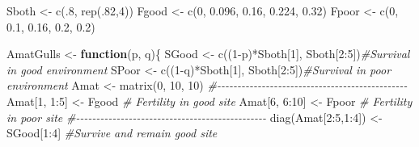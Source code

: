 \documentclass[
]{book}
\newenvironment{Shaded}{\begin{snugshade}}{\end{snugshade}}
\newcommand{\CommentTok}[1]{\textcolor[rgb]{0.56,0.35,0.01}{\textit{#1}}}
\newcommand{\ControlFlowTok}[1]{\textcolor[rgb]{0.13,0.29,0.53}{\textbf{#1}}}
\newcommand{\DecValTok}[1]{\textcolor[rgb]{0.00,0.00,0.81}{#1}}
\newcommand{\FloatTok}[1]{\textcolor[rgb]{0.00,0.00,0.81}{#1}}
\newcommand{\FunctionTok}[1]{\textcolor[rgb]{0.00,0.00,0.00}{#1}}
\newcommand{\NormalTok}[1]{#1}
\newcommand{\OtherTok}[1]{\textcolor[rgb]{0.56,0.35,0.01}{#1}}
\newcommand{\SpecialCharTok}[1]{\textcolor[rgb]{0.00,0.00,0.00}{#1}}
\begin{document}
\begin{Shaded}
\begin{Highlighting}[]
\NormalTok{Sboth }\OtherTok{\textless{}{-}} \FunctionTok{c}\NormalTok{(.}\DecValTok{8}\NormalTok{, }\FunctionTok{rep}\NormalTok{(.}\DecValTok{82}\NormalTok{,}\DecValTok{4}\NormalTok{))}
\NormalTok{Fgood }\OtherTok{\textless{}{-}} \FunctionTok{c}\NormalTok{(}\DecValTok{0}\NormalTok{, }\FloatTok{0.096}\NormalTok{, }\FloatTok{0.16}\NormalTok{, }\FloatTok{0.224}\NormalTok{, }\FloatTok{0.32}\NormalTok{) }
\NormalTok{Fpoor }\OtherTok{\textless{}{-}} \FunctionTok{c}\NormalTok{(}\DecValTok{0}\NormalTok{, }\FloatTok{0.1}\NormalTok{, }\FloatTok{0.16}\NormalTok{, }\FloatTok{0.2}\NormalTok{, }\FloatTok{0.2}\NormalTok{) }

\NormalTok{AmatGulls }\OtherTok{\textless{}{-}} \ControlFlowTok{function}\NormalTok{(p, q)\{}
\NormalTok{  SGood }\OtherTok{\textless{}{-}} \FunctionTok{c}\NormalTok{((}\DecValTok{1}\SpecialCharTok{{-}}\NormalTok{p)}\SpecialCharTok{*}\NormalTok{Sboth[}\DecValTok{1}\NormalTok{], Sboth[}\DecValTok{2}\SpecialCharTok{:}\DecValTok{5}\NormalTok{])}\CommentTok{\#Survival in good environment}
\NormalTok{  SPoor }\OtherTok{\textless{}{-}} \FunctionTok{c}\NormalTok{((}\DecValTok{1}\SpecialCharTok{{-}}\NormalTok{q)}\SpecialCharTok{*}\NormalTok{Sboth[}\DecValTok{1}\NormalTok{], Sboth[}\DecValTok{2}\SpecialCharTok{:}\DecValTok{5}\NormalTok{])}\CommentTok{\#Survival in poor environment}
\NormalTok{  Amat }\OtherTok{\textless{}{-}} \FunctionTok{matrix}\NormalTok{(}\DecValTok{0}\NormalTok{, }\DecValTok{10}\NormalTok{, }\DecValTok{10}\NormalTok{) }
  \CommentTok{\#{-}{-}{-}{-}{-}{-}{-}{-}{-}{-}{-}{-}{-}{-}{-}{-}{-}{-}{-}{-}{-}{-}{-}{-}{-}{-}{-}{-}{-}{-}{-}{-}{-}{-}{-}{-}{-}{-}{-}{-}{-}{-}{-}{-}{-}{-}{-}}
\NormalTok{  Amat[}\DecValTok{1}\NormalTok{, }\DecValTok{1}\SpecialCharTok{:}\DecValTok{5}\NormalTok{] }\OtherTok{\textless{}{-}}\NormalTok{ Fgood }\CommentTok{\# Fertility in good site}
\NormalTok{  Amat[}\DecValTok{6}\NormalTok{, }\DecValTok{6}\SpecialCharTok{:}\DecValTok{10}\NormalTok{] }\OtherTok{\textless{}{-}}\NormalTok{ Fpoor }\CommentTok{\# Fertility in poor site}
  \CommentTok{\#{-}{-}{-}{-}{-}{-}{-}{-}{-}{-}{-}{-}{-}{-}{-}{-}{-}{-}{-}{-}{-}{-}{-}{-}{-}{-}{-}{-}{-}{-}{-}{-}{-}{-}{-}{-}{-}{-}{-}{-}{-}{-}{-}{-}{-}{-}{-}}
  \FunctionTok{diag}\NormalTok{(Amat[}\DecValTok{2}\SpecialCharTok{:}\DecValTok{5}\NormalTok{,}\DecValTok{1}\SpecialCharTok{:}\DecValTok{4}\NormalTok{]) }\OtherTok{\textless{}{-}}\NormalTok{ SGood[}\DecValTok{1}\SpecialCharTok{:}\DecValTok{4}\NormalTok{] }\CommentTok{\#Survive and remain good site}

\end{Highlighting}
\end{Shaded}
\end{document}
